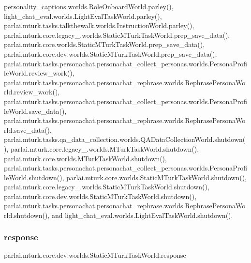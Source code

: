 personality\+\_\+captions.\+worlds.\+Role\+Onboard\+World.\+parley(), light\+\_\+chat\+\_\+eval.\+worlds.\+Light\+Eval\+Task\+World.\+parley(), parlai.\+mturk.\+tasks.\+talkthewalk.\+worlds.\+Instruction\+World.\+parley(), parlai.\+mturk.\+core.\+legacy\+\_.\+worlds.\+Static\+M\+Turk\+Task\+World.\+prep\+\_\+save\+\_\+data(), parlai.\+mturk.\+core.\+worlds.\+Static\+M\+Turk\+Task\+World.\+prep\+\_\+save\+\_\+data(), parlai.\+mturk.\+core.\+dev.\+worlds.\+Static\+M\+Turk\+Task\+World.\+prep\+\_\+save\+\_\+data(), parlai.\+mturk.\+tasks.\+personachat.\+personachat\+\_\+collect\+\_\+personas.\+worlds.\+Persona\+Profile\+World.\+review\+\_\+work(), parlai.\+mturk.\+tasks.\+personachat.\+personachat\+\_\+rephrase.\+worlds.\+Rephrase\+Persona\+World.\+review\+\_\+work(), parlai.\+mturk.\+tasks.\+personachat.\+personachat\+\_\+collect\+\_\+personas.\+worlds.\+Persona\+Profile\+World.\+save\+\_\+data(), parlai.\+mturk.\+tasks.\+personachat.\+personachat\+\_\+rephrase.\+worlds.\+Rephrase\+Persona\+World.\+save\+\_\+data(), parlai.\+mturk.\+tasks.\+qa\+\_\+data\+\_\+collection.\+worlds.\+Q\+A\+Data\+Collection\+World.\+shutdown(), parlai.\+mturk.\+core.\+legacy\+\_.\+worlds.\+M\+Turk\+Task\+World.\+shutdown(), parlai.\+mturk.\+core.\+worlds.\+M\+Turk\+Task\+World.\+shutdown(), parlai.\+mturk.\+tasks.\+personachat.\+personachat\+\_\+collect\+\_\+personas.\+worlds.\+Persona\+Profile\+World.\+shutdown(), parlai.\+mturk.\+core.\+worlds.\+Static\+M\+Turk\+Task\+World.\+shutdown(), parlai.\+mturk.\+core.\+legacy\+\_.\+worlds.\+Static\+M\+Turk\+Task\+World.\+shutdown(), parlai.\+mturk.\+core.\+dev.\+worlds.\+Static\+M\+Turk\+Task\+World.\+shutdown(), parlai.\+mturk.\+tasks.\+personachat.\+personachat\+\_\+rephrase.\+worlds.\+Rephrase\+Persona\+World.\+shutdown(), and light\+\_\+chat\+\_\+eval.\+worlds.\+Light\+Eval\+Task\+World.\+shutdown().

\mbox{\label{classparlai_1_1mturk_1_1core_1_1dev_1_1worlds_1_1StaticMTurkTaskWorld_ac6d8c12abc3a318337ab68b546631c79}} 
\subsubsection{\texorpdfstring{response}{response}}
{\footnotesize\ttfamily parlai.\+mturk.\+core.\+dev.\+worlds.\+Static\+M\+Turk\+Task\+World.\+response}



